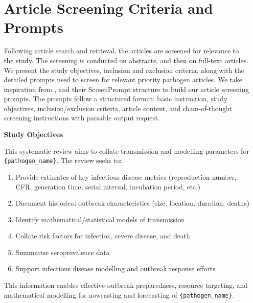 
\clearpage
\section{Article Screening Criteria and Prompts}
\label{app:study_objectives}
\label{app:article_screening_prompts_criteri_fulltext}

\label{app:article_screening_prompts_criteria}
Following article search and retrieval, the articles are screened for relevance to the study. The screening is conducted on abstracts, and then on full-text articles. We present the study objectives, inclusion and exclusion criteria, along with the detailed prompts used to screen for relevant priority pathogen articles. We take inspiration from \cite{ottoSRPromptPaper}, and their ScreenPrompt structure to build our article screening prompts. 
The prompts follow a structured format: basic instruction, study objectives, inclusion/exclusion criteria, article content, and chain-of-thought screening instructions with parsable output request.


\begin{tcolorbox}[
    enhanced,
    colback=orange!5,
    colframe=orange!20,
    boxrule=0pt,
    leftrule=3pt,
    arc=0pt,
    left=6pt, right=6pt, top=2pt, bottom=2pt
]
{\small
{\textbf{\textcolor{orange!70!black}{Study Objectives}}}

\smallskip

This systematic review aims to collate transmission and modelling parameters for \texttt{\{pathogen\_name\}}. The review seeks to:

\begin{enumerate}[leftmargin=*, itemsep=-3pt, topsep=2pt]
    \item Provide estimates of key infectious disease metrics (reproduction number, CFR, generation time, serial interval, incubation period, etc.)
    \item Document historical outbreak characteristics (size, location, duration, deaths)
    \item Identify mathematical/statistical models of transmission
    \item Collate risk factors for infection, severe disease, and death
    \item Summarize seroprevalence data
    \item Support infectious disease modelling and outbreak response efforts
\end{enumerate}
}

\vspace{2pt}
{\small
This information enables effective outbreak preparedness, resource targeting, and mathematical modelling for nowcasting and forecasting of \texttt{\{pathogen\_name\}}.}
\end{tcolorbox}

